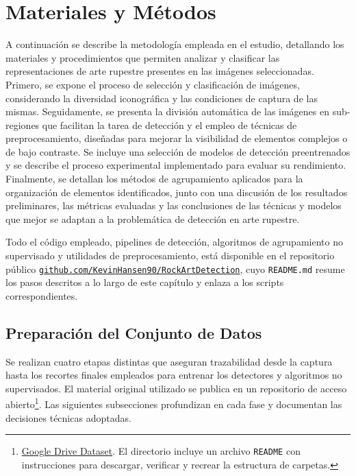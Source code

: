 \chapter{Materiales y Métodos}

A continuación se describe la metodología empleada en el estudio, detallando los materiales y procedimientos que permiten analizar y clasificar las representaciones de arte rupestre presentes en las imágenes seleccionadas.
Primero, se expone el proceso de selección y clasificación de imágenes, considerando la diversidad iconográfica y las condiciones de captura de las mismas.
Seguidamente, se presenta la división automática de las imágenes en sub-regiones que facilitan la tarea de detección y el empleo de técnicas de preprocesamiento, diseñadas para mejorar la visibilidad de elementos complejos o de bajo contraste.
Se incluye una selección de modelos de detección preentrenados y se describe el proceso experimental implementado para evaluar su rendimiento.
Finalmente, se detallan los métodos de agrupamiento aplicados para la organización de elementos identificados, junto con una discusión de los resultados preliminares, las métricas evaluadas y las conclusiones de las técnicas y modelos que mejor se adaptan a la problemática de detección en arte rupestre.


\noindent
Todo el código empleado, pipelines de detección, algoritmos de agrupamiento no supervisado y utilidades de preprocesamiento, está disponible en el repositorio público
\href{https://github.com/KevinHansen90/RockArtDetection}{\texttt{github.com/KevinHansen90/RockArtDetection}}, cuyo \texttt{README.md} resume los pasos descritos a lo largo de este capítulo y enlaza a los scripts correspondientes.

\section{Preparación del Conjunto de Datos}

Se realizan cuatro etapas distintas que aseguran trazabilidad desde la captura hasta los recortes finales empleados para entrenar los detectores y algoritmos no supervisados.
El material original utilizado se publica en un repositorio de acceso abierto\footnote{\href{https://drive.google.com/drive/u/0/folders/1JU5tohaRw7Rm83S9uUK9KazIPLRebl1x}{Google Drive Dataset}.
El directorio incluye un archivo \texttt{README} con instrucciones para descargar, verificar y recrear la estructura de carpetas.}.
Las siguientes subsecciones profundizan en cada fase y documentan las decisiones técnicas adoptadas.

